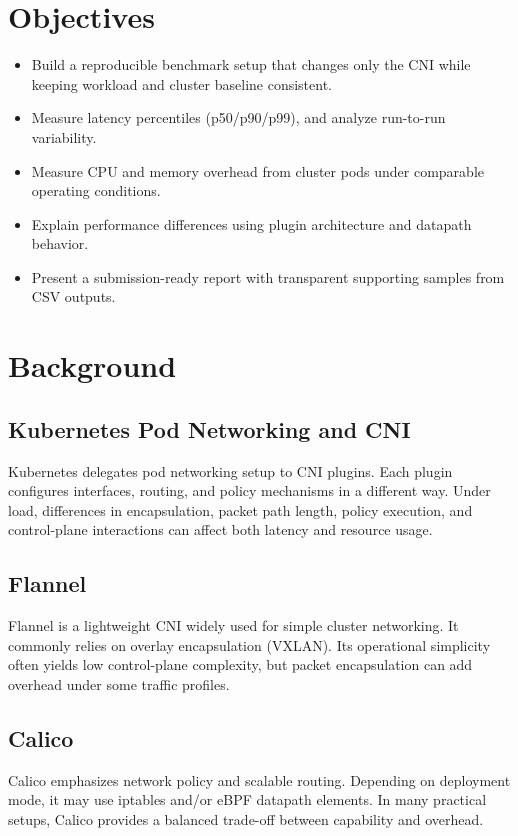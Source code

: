\documentclass[12pt,a4paper]{article}
\begin{document}
\section{Objectives}
\begin{itemize}[leftmargin=1.5em]
    \item Build a reproducible benchmark setup that changes only the CNI while keeping workload and cluster baseline consistent.
    \item Measure latency percentiles (p50/p90/p99), and analyze run-to-run variability.
    \item Measure CPU and memory overhead from cluster pods under comparable operating conditions.
    \item Explain performance differences using plugin architecture and datapath behavior.
    \item Present a submission-ready report with transparent supporting samples from CSV outputs.
\end{itemize}

\section{Background}
\subsection{Kubernetes Pod Networking and CNI}
Kubernetes delegates pod networking setup to CNI plugins. Each plugin configures interfaces, routing, and policy mechanisms in a different way. Under load, differences in encapsulation, packet path length, policy execution, and control-plane interactions can affect both latency and resource usage.

\subsection{Flannel}
Flannel is a lightweight CNI widely used for simple cluster networking. It commonly relies on overlay encapsulation (VXLAN). Its operational simplicity often yields low control-plane complexity, but packet encapsulation can add overhead under some traffic profiles.

\subsection{Calico}
Calico emphasizes network policy and scalable routing. Depending on deployment mode, it may use iptables and/or eBPF datapath elements. In many practical setups, Calico provides a balanced trade-off between capability and overhead.
\end{document}
